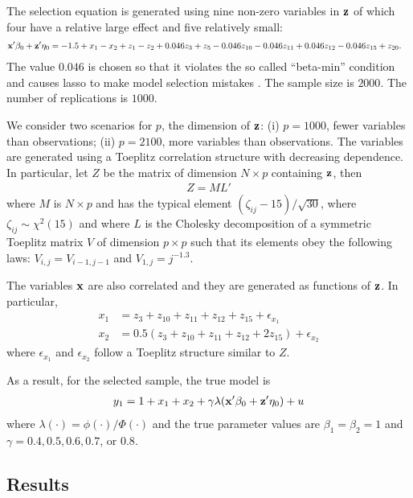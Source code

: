 \documentclass[11pt]{article}
\begin{document}
The selection equation is generated using nine non-zero variables in $\mathbf{z}$ of which four have a relative large effect and five relatively small:
\begin{align*}
\mathbf{x}' \beta_0 + \mathbf{z}'\eta_0 &= -1.5 + x_1 - x_2 + z_1 - z_2 + 0.046z_3 + z_5 -
0.046z_{10}  - 0.046z_{11} + 0.046z_{12} - 0.046z_{15} + z_{20}.
\end{align*}
The value $0.046$ is chosen so that it violates the so called ``beta-min'' condition and causes lasso to make model selection mistakes \cite[see, e.g.,][]{liu/etal:20, drukker/liu:22}.  The sample size is $2000$. The number of
replications is $1000$. 

We consider two scenarios for  $p$, the dimension of $\mathbf{z}$: (i) $p = 1000$, fewer variables than observations; (ii) $p=2100$, more variables than observations. The variables are generated using a Toeplitz correlation structure with decreasing
dependence. In particular, let $Z$ be the matrix of dimension $N
\times p$ containing $\mathbf{z}$, then 
\begin{align*}
Z = M L'
\end{align*} 
where $M$ is $N \times p$ and has the typical element
$(\zeta_{ij} -15)/\sqrt{30}$, where $\zeta_{ij} \sim
\chi^2(15)$ and where $L$ is the Cholesky decomposition of a symmetric Toeplitz
matrix $V$ of dimension $p \times p$ such that its elements obey the following laws: $V_{i,j} =
V_{i-1, j-1}$ and $V_{1, j}= j^{-1.3}$.

The variables $\mathbf{x}$ are also correlated and they are generated as functions of $\mathbf{z}$. In
particular,
\begin{align*}
x_1 &= z_3 +z_{10} + z_{11} +z_{12} + z_{15} + \epsilon_{x_1} \\
x_2 &= 0.5(z_3 +z_{10} + z_{11} +z_{12} + 2z_{15}) + \epsilon_{x_2}
\end{align*}
where $\epsilon_{x_1}$ and $\epsilon_{x_2}$ follow a Toeplitz structure similar
to $Z$.

As a result, for the selected sample, the true model
is 
\begin{align*}
	y_1 = 1 + x_1 + x_2 + \gamma\lambda(\mathbf{x}' \beta_0 + \mathbf{z}'\eta_0) + u
	\label{eq:model}
\end{align*}
where $\lambda(\cdot) = \phi(\cdot)/\Phi(\cdot)$ and the true parameter values are
$\beta_1 = \beta_2 = 1$ and $\gamma = 0.4, 0.5, 0.6, 0.7$, or $0.8$.

\subsection{Results}
\end{document}
